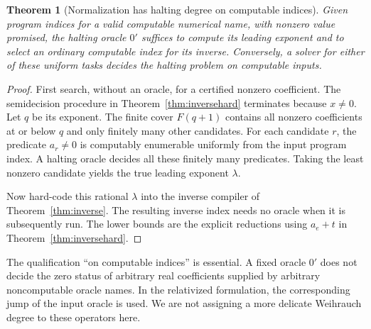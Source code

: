 \documentclass[11pt,letterpaper]{article}
\numberwithin{equation}{section}
\newtheorem{theorem}{Theorem}[section]
\theoremstyle{definition}
\theoremstyle{remark}
\begin{document}
\begin{theorem}[Normalization has halting degree on computable indices]
\label{thm:jump}
Given program indices for a valid computable numerical name, with nonzero
value promised, the halting oracle $0'$ suffices to compute its leading
exponent and to select an ordinary computable index for its inverse.
Conversely, a solver for either of these uniform tasks decides the halting
problem on computable inputs.
\end{theorem}
\begin{proof}
First search, without an oracle, for a certified nonzero coefficient.
The semidecision procedure in Theorem~\ref{thm:inversehard} terminates
because $x\ne0$. Let $q$ be its exponent. The finite cover $F(q+1)$
contains all nonzero coefficients at or below $q$ and only finitely many
other candidates. For each candidate $r$, the predicate $a_r\ne0$ is
computably enumerable uniformly from the input program index. A halting
oracle decides all these finitely many predicates. Taking the least
nonzero candidate yields the true leading exponent $\lambda$.

Now hard-code this rational $\lambda$ into the inverse compiler of
Theorem~\ref{thm:inverse}. The resulting inverse index needs no oracle
when it is subsequently run. The lower bounds are the explicit reductions
using $a_e+t$ in Theorem~\ref{thm:inversehard}.
\end{proof}

The qualification ``on computable indices'' is essential. A fixed oracle
$0'$ does not decide the zero status of arbitrary real coefficients supplied
by arbitrary noncomputable oracle names. In the relativized formulation,
the corresponding jump of the input oracle is used. We are not assigning
a more delicate Weihrauch degree to these operators here.
\end{document}
